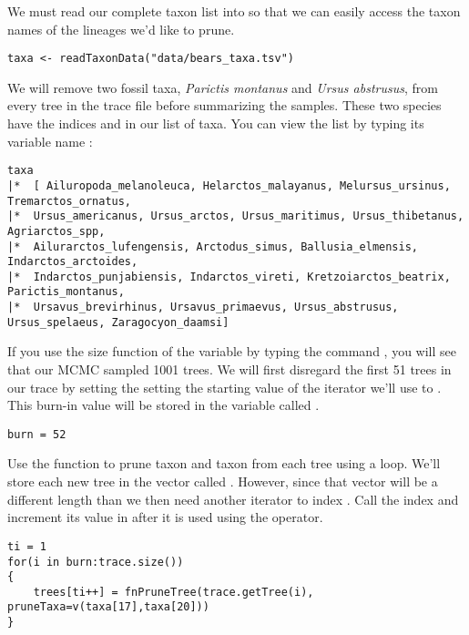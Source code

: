 We must read our complete taxon list into \RevBayes so that we can easily access the taxon names of the lineages we'd like to prune.
{\tt \begin{snugshade*}
\begin{lstlisting}
taxa <- readTaxonData("data/bears_taxa.tsv")
\end{lstlisting}
\end{snugshade*}}

We will 
remove two fossil taxa, \textit{Parictis montanus} and \textit{Ursus abstrusus}, from every tree in the trace file before summarizing the samples.
These two species have the indices  and  in our list of taxa. 
You can view the list by typing its variable name :
{\tt \begin{snugshade*}
\begin{lstlisting}
taxa 
|*  [ Ailuropoda_melanoleuca, Helarctos_malayanus, Melursus_ursinus, Tremarctos_ornatus,
|*  Ursus_americanus, Ursus_arctos, Ursus_maritimus, Ursus_thibetanus, Agriarctos_spp,
|*  Ailurarctos_lufengensis, Arctodus_simus, Ballusia_elmensis, Indarctos_arctoides,
|*  Indarctos_punjabiensis, Indarctos_vireti, Kretzoiarctos_beatrix, Parictis_montanus,
|*  Ursavus_brevirhinus, Ursavus_primaevus, Ursus_abstrusus, Ursus_spelaeus, Zaragocyon_daamsi]
\end{lstlisting}
\end{snugshade*}}

If you use the size function of the  variable by typing the command \colorbox{shadecolor}{}, you will see that our MCMC sampled 1001 trees. 
We will first disregard the first 51 trees in our trace by setting the setting the starting value of the iterator we'll use to . 
This burn-in value will be stored in the variable called .
{\tt \begin{snugshade*}
\begin{lstlisting}
burn = 52
\end{lstlisting}
\end{snugshade*}}

Use the  function to prune taxon  and taxon  from each tree using a  loop.
We'll store each new tree in the vector called .
However, since that vector will be a different length than  we then need another iterator to index .
Call the  index  and increment its value in after it is used using the \cl{++} operator.
{\tt \begin{snugshade*}
\begin{lstlisting}
ti = 1
for(i in burn:trace.size())
{
    trees[ti++] = fnPruneTree(trace.getTree(i), pruneTaxa=v(taxa[17],taxa[20]))
}
\end{lstlisting}
\end{snugshade*}}

